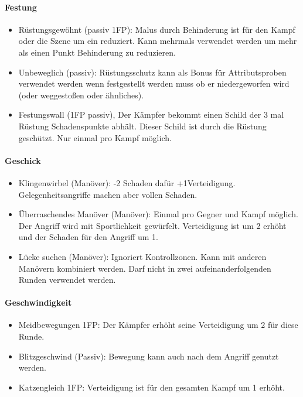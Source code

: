 \documentclass{article}
\begin{document}
\paragraph{Festung}

\begin{itemize}
\item Rüstungsgewöhnt (passiv 1FP): Malus durch Behinderung ist für den Kampf oder die Szene um ein reduziert. Kann mehrmals verwendet werden um mehr als einen Punkt Behinderung zu reduzieren.
\item Unbeweglich (passiv): Rüstungsschutz kann als Bonus für Attributsproben verwendet werden wenn festgestellt werden muss ob er niedergeworfen wird (oder weggestoßen oder ähnliches).
\item Festungswall (1FP passiv), Der Kämpfer bekommt einen Schild der 3 mal Rüstung Schadenspunkte abhält. Dieser Schild ist durch die Rüstung geschützt. Nur einmal pro Kampf möglich.
\end{itemize}

\paragraph{Geschick}

\begin{itemize}
\item Klingenwirbel (Manöver): -2 Schaden dafür +1Verteidigung. Gelegenheitsangriffe machen aber vollen Schaden.
\item Überraschendes Manöver (Manöver): Einmal pro Gegner und Kampf möglich. Der Angriff wird mit Sportlichkeit gewürfelt. Verteidigung ist um 2 erhöht und der Schaden für den Angriff um 1.
\item Lücke suchen (Manöver): Ignoriert Kontrollzonen. Kann mit anderen Manövern kombiniert werden. Darf nicht in zwei aufeinanderfolgenden Runden verwendet werden.
\end{itemize}

\paragraph{Geschwindigkeit}

\begin{itemize}
\item Meidbewegungen 1FP: Der Kämpfer erhöht seine Verteidigung um 2 für diese Runde.
\item Blitzgeschwind (Passiv): Bewegung kann auch nach dem Angriff genutzt werden.
\item Katzengleich 1FP: Verteidigung ist für den gesamten Kampf um 1 erhöht.
\end{itemize}
\end{document}
